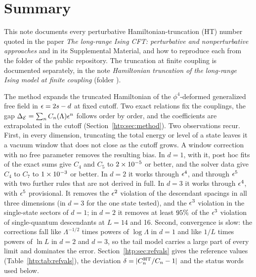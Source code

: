 \section{Summary}\label{htp:sec:summary}
This note documents every perturbative Hamiltonian-truncation (HT) number quoted in the paper \emph{The long-range Ising
CFT: perturbative and nonperturbative approaches} and in its Supplemental Material, and how to
reproduce each from the folder  of the public repository. The truncation at finite coupling is
documented separately, in the note \emph{Hamiltonian truncation of the long-range Ising model at finite coupling}
(folder ).

The method expands the truncated Hamiltonian of the $\phi^4$-deformed generalized free field in $\epsilon=2s-d$ at fixed
cutoff. Two exact relations fix the couplings, the gap $\Delta_{\mathcal E}=\sum_nC_n(\Lambda)\epsilon^n$ follows order by order, and the
coefficients are extrapolated in the cutoff (Section~\ref{htp:sec:method}). Two observations recur. First, in every
dimension, truncating the total energy or level of a state leaves it a vacuum window that does not close as the cutoff
grows. A window correction with no free parameter removes the resulting bias. In $d=1$, with it, post hoc fits of the exact
sums give $C_4$ and $C_5$ to $2\times10^{-5}$ or better, and the solver data give $C_4$ to $C_7$ to
$1\times10^{-3}$ or better. In $d=2$ it
works through $\epsilon^4$, and through $\epsilon^5$ with two further rules that are not derived in full. In $d=3$ it works
through $\epsilon^4$, with $\epsilon^5$ provisional. It removes the $\epsilon^2$ violation of the descendant spacings in all three dimensions
(in $d=3$ for the one state tested), and the $\epsilon^3$ violation in the single-state sectors of $d=1$; in $d=2$ it
removes at least $95\%$ of the $\epsilon^3$ violation of single-quantum descendants at $L=14$ and 16. Second, convergence is slow: the corrections fall like
$\Lambda^{-1/2}$ times powers of $\log\Lambda$ in $d=1$ and like $1/L$ times powers of $\ln L$ in $d=2$ and $d=3$, so the
tail model carries a large part of every limit and dominates the error. Section~\ref{htp:sec:refvals} gives the reference
values (Table~\ref{htp:tab:refvals}), the deviation $\delta=|C_n^{\rm HT}/C_n-1|$ and the status words used below.

